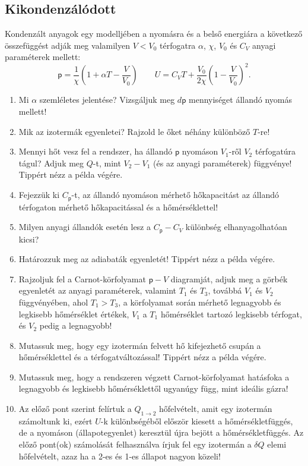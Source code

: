 \documentclass[12pt,a4paper]{scrartcl}
\newcommand{\pres}{\mathsf p}	%
\begin{document}
\subsection{Kikondenzálódott} %
Kondenzált anyagok egy modelljében a nyomásra és a belső energiára a következő összefüggést adják meg valamilyen $V<V_0$ térfogatra $\alpha$, $\chi$, $V_0$ és $C_V$ anyagi paraméterek mellett:
\[\pres = \frac{1}{\chi }\left( {1 + \alpha T - \frac{V}{{{V_0}}}} \right)\qquad U = {C_V}T + \frac{{{V_0}}}{{2\chi }}{\left( {1 - \frac{V}{{{V_0}}}} \right)^2}.\]
\begin{enumerate}
\item Mi $\alpha$ szemléletes jelentése? Vizsgáljuk meg $d\pres$ mennyiséget állandó nyomás mellett!
\item Mik az izotermák egyenletei? Rajzold le őket néhány különböző $T$-re!
\item Mennyi hőt vesz fel a rendszer, ha állandó $\pres$ nyomáson $V_1$-ről $V_2$ térfogatúra tágul? Adjuk meg $Q$-t, mint $V_2 - V_1$ (és az anyagi paraméterek) függvénye! \footnotesize Tippért nézz a példa végére.\normalsize
\item Fejezzük ki $C_\pres$-t, az állandó nyomáson mérhető hőkapacitást az állandó térfogaton mérhető hőkapacitással és a hőmérséklettel!
\item Milyen anyagi állandók esetén lesz a $C_\pres - C_V$ különbség elhanyagolhatóan kicsi?
\item Határozzuk meg az adiabaták egyenletét! \footnotesize Tippért nézz a példa végére.\normalsize%
\item Rajzoljuk fel a Carnot-körfolyamat $\pres - V$ diagramját, adjuk meg a görbék egyenletét az anyagi paraméterek, valamint  $T_1$ és $T_3$, továbbá $V_1$ és $V_2$ függvényében, ahol $T_1>T_3$, a körfolyamat során mérhető legnagyobb és legkisebb hőmérséklet értékek, $V_1$ a $T_1$ hőmérséklet tartozó legkisebb térfogat, és $V_2$ pedig a legnagyobb! 
\item Mutassuk meg, hogy egy izotermán felvett hő kifejezhető csupán a hőmérséklettel és a térfogatváltozással! \footnotesize Tippért nézz a példa végére.\normalsize
\item Mutassuk meg, hogy a rendszeren végzett Carnot-körfolyamat hatásfoka a legnagyobb és legkisebb hőmérséklettől ugyanúgy függ, mint ideális gázra!%
\item Az előző pont szerint felírtuk a $Q_{1 \to 2}$ hőfelvételt, amit egy izotermán számoltunk ki, ezért $U$-k különbségéből először kiesett a hőmérsékletfüggés, de a nyomáson (állapotegyenlet) keresztül újra bejött a hőmérsékletfüggés. Az előző pont(ok) számolását felhasználva írjuk fel egy izotermán a $\delta Q$ elemi hőfelvételt, azaz ha a 2-es és 1-es állapot nagyon közeli!


\end{enumerate}
\end{document}
